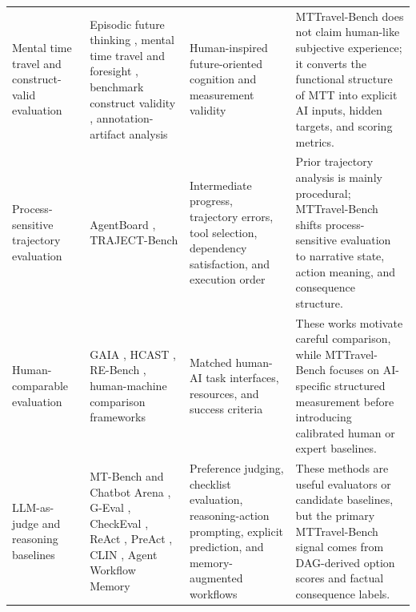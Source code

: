 \documentclass[pdflatex,sn-mathphys-num]{sn-jnl}%
\theoremstyle{thmstyleone}%
\theoremstyle{thmstyletwo}%
\theoremstyle{thmstylethree}%
\begin{document}
\begin{table}[htbp]
\begin{tabular}{p{} p{} p{} p{}}
Mental time travel and construct-valid evaluation & Episodic future thinking \cite{atance2001episodic}, mental time travel and foresight \cite{suddendorf2007evolution}, benchmark construct validity \cite{bean2025measuring}, annotation-artifact analysis \cite{gururangan2018annotation} & Human-inspired future-oriented cognition and measurement validity & MTTravel-Bench does not claim human-like subjective experience; it converts the functional structure of MTT into explicit AI inputs, hidden targets, and scoring metrics. \\
Process-sensitive trajectory evaluation & AgentBoard \cite{ma2024agentboard}, TRAJECT-Bench \cite{he2025trajectbencha} & Intermediate progress, trajectory errors, tool selection, dependency satisfaction, and execution order & Prior trajectory analysis is mainly procedural; MTTravel-Bench shifts process-sensitive evaluation to narrative state, action meaning, and consequence structure. \\
Human-comparable evaluation & GAIA \cite{mialon2023gaia}, HCAST \cite{rein2025hcast}, RE-Bench \cite{wijk2024rebench}, human-machine comparison frameworks \cite{cowley2022framework,lee2022evaluating} & Matched human-AI task interfaces, resources, and success criteria & These works motivate careful comparison, while MTTravel-Bench focuses on AI-specific structured measurement before introducing calibrated human or expert baselines. \\
LLM-as-judge and reasoning baselines & MT-Bench and Chatbot Arena \cite{zheng2023judging}, G-Eval \cite{liu2023geval}, CheckEval \cite{lee2025checkeval}, ReAct \cite{yao2022react}, PreAct \cite{fu2025preact}, CLIN \cite{majumder2023clin}, Agent Workflow Memory \cite{wang2024agent} & Preference judging, checklist evaluation, reasoning-action prompting, explicit prediction, and memory-augmented workflows & These methods are useful evaluators or candidate baselines, but the primary MTTravel-Bench signal comes from DAG-derived option scores and factual consequence labels. \\
\bottomrule
\end{tabular}
\end{table}
\end{document}
